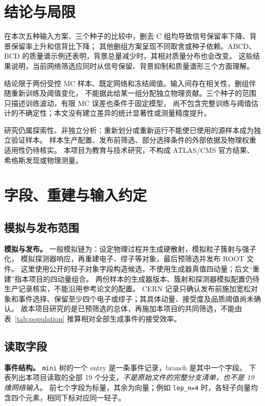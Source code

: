 \documentclass[11pt,a4paper,fontset=fandol,scheme=plain]{ctexart}
\begin{document}
\section{结论与局限}\label{sec:conclusion}

在本次五种输入方案、三个种子的比较中，删去 C 组均导致信号保留率下降、背景保留率上升和信背比下降；
其他删组方案呈现不同取舍或种子依赖。ABCD、BCD 的质量谱示例还表明，背景总量减少时，其相对质量分布也会改变。
这些结果说明，当前网络筛选应同时从信号保留、背景抑制和质量谱形三个方面理解。

结论限于两份受控 MC 样本、既定网络和冻结阈值。输入间存在相关性，删组伴随重新训练及阈值变化，
不能据此给某一组分配独立物理贡献。三个种子的范围只描述训练波动，有限 MC 误差也条件于固定模型，
尚不包含完整训练与阈值估计的不确定性；本文没有建立差异的统计显著性或测量精度提升。

研究仍属探索性、非独立分析：重新划分或重新运行不能使已使用的源样本成为独立验证样本。
样本生产配置、发布前筛选、部分选择条件的外部依据及物理权重适用性仍待核实。
本项目为教育与技术研究，不构成 ATLAS/CMS 官方结果、希格斯发现或物理测量。

\clearpage
\appendix

\section{字段、重建与输入约定}\label{app:fields}

\subsection{模拟与发布范围}
\textbf{模拟与发布。} 一般模拟链为：设定物理过程并生成硬散射，模拟粒子簇射与强子化，
模拟探测器响应，再重建电子、缪子等对象，最后预筛选并发布 ROOT 文件。
这里使用公开的轻子对象字段构造候选，不使用生成器真值四动量；后文“重建”指本项目的四动量组合。
两份样本的生成器版本、簇射和探测器模拟配置仍待生产记录核实，不能沿用参考论文的配置。
CERN 记录只确认发布前施加宽松对象和事件选择、保留至少四个电子或缪子；其具体动量、接受度及品质阈值尚未确认。
故本项目研究的是已预筛选的总体，再施加本项目的共同筛选，不能由表~\ref{tab:population} 推算相对全部生成事件的接受效率。
\subsection{读取字段}
\textbf{事件结构。} \texttt{mini} 树的一个 entry 是一条事件记录，branch 是其中一个字段。
下表列出本项目读取的全部 19 个分支，\emph{不是原始文件的完整分支清单，也不是 19 维网络输入}。
前七个字段为标量，其余为向量；例如 \texttt{lep\_n=4} 时，各轻子向量均含四个元素，相同下标对应同一轻子。
\end{document}

